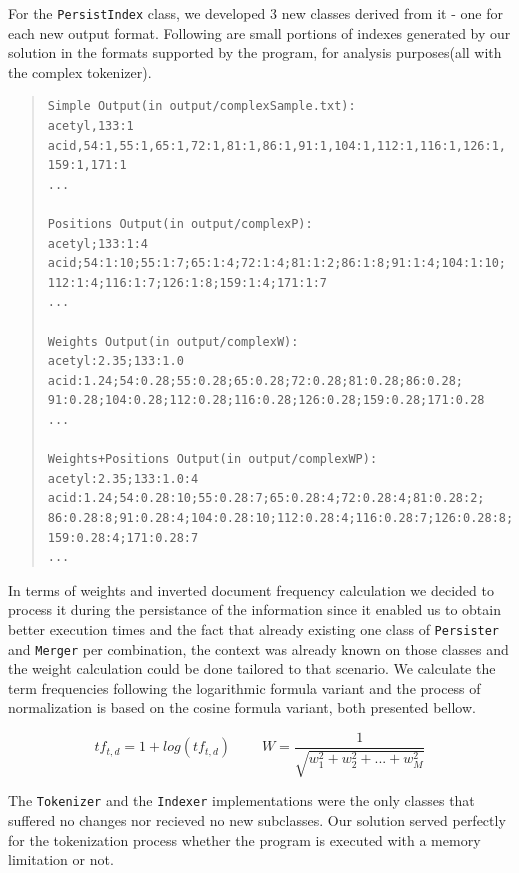 \documentclass[12pt]{article}
\begin{document}
For the \texttt{PersistIndex} class, we developed 3 new classes derived from 
it - one for each new output format. 
Following are small portions of indexes generated by our solution in the formats
supported by the program, for analysis purposes(all with the complex tokenizer).

\begingroup
\addtolength\leftmargini{-0.4in}
\addtolength\baselineskip{-0.05in}
\begin{quote}
\begin{verbatim}
Simple Output(in output/complexSample.txt):
acetyl,133:1
acid,54:1,55:1,65:1,72:1,81:1,86:1,91:1,104:1,112:1,116:1,126:1,
159:1,171:1
...

Positions Output(in output/complexP):
acetyl;133:1:4
acid;54:1:10;55:1:7;65:1:4;72:1:4;81:1:2;86:1:8;91:1:4;104:1:10;
112:1:4;116:1:7;126:1:8;159:1:4;171:1:7
...

Weights Output(in output/complexW):
acetyl:2.35;133:1.0
acid:1.24;54:0.28;55:0.28;65:0.28;72:0.28;81:0.28;86:0.28;
91:0.28;104:0.28;112:0.28;116:0.28;126:0.28;159:0.28;171:0.28
...

Weights+Positions Output(in output/complexWP):
acetyl:2.35;133:1.0:4
acid:1.24;54:0.28:10;55:0.28:7;65:0.28:4;72:0.28:4;81:0.28:2;
86:0.28:8;91:0.28:4;104:0.28:10;112:0.28:4;116:0.28:7;126:0.28:8;
159:0.28:4;171:0.28:7
...
\end{verbatim}
\end{quote}
\endgroup

In terms of weights and inverted document frequency calculation we decided to process 
it during the persistance of the information since it enabled us to obtain better execution 
times and the fact that already existing one class of \texttt{Persister} and \texttt{Merger} 
per combination, the context was already known on those classes and the weight calculation 
could be done tailored to that scenario.
We calculate the term frequencies following the logarithmic formula variant and 
the process of normalization is based on the cosine formula variant, both 
presented bellow.

\begin{equation*}
tf_{t,d} = 1 + log(tf_{t,d}) \>\>\>\>\>
\>\>\>\>\> W = \frac{1}{\sqrt{w_1^2 + w_2^2 + ... + w_M^2}}
\end{equation*}

The \texttt{Tokenizer} and the \texttt{Indexer} implementations were the only classes that suffered no
changes nor recieved no new subclasses. 
Our solution served perfectly for the tokenization process whether the program 
is executed with a memory limitation or not.
\end{document}
